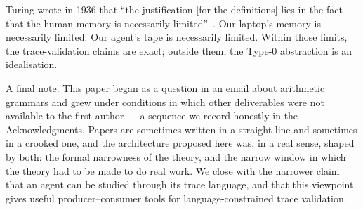 Turing wrote in 1936 that ``the justification [for the
definitions] lies in the fact that the human memory is
necessarily limited''~\cite{turing1936computable}.  Our laptop's
memory is necessarily limited.  Our agent's tape is necessarily
limited.  Within those limits, the trace-validation claims are exact;
outside them, the Type-0 abstraction is an idealisation.

A final note.  This paper began as a question in an email about
arithmetic grammars and grew under conditions in which other
deliverables were not available to the first author --- a
sequence we record honestly in the Acknowledgments.  Papers are
sometimes written in a straight line and sometimes in a crooked
one, and the architecture proposed here was, in a real sense,
shaped by both: the formal narrowness of the theory, and the
narrow window in which the theory had to be made to do real
work.  We close with the narrower claim that an agent can be studied
through its trace language, and that this viewpoint gives useful
producer--consumer tools for language-constrained trace validation.
